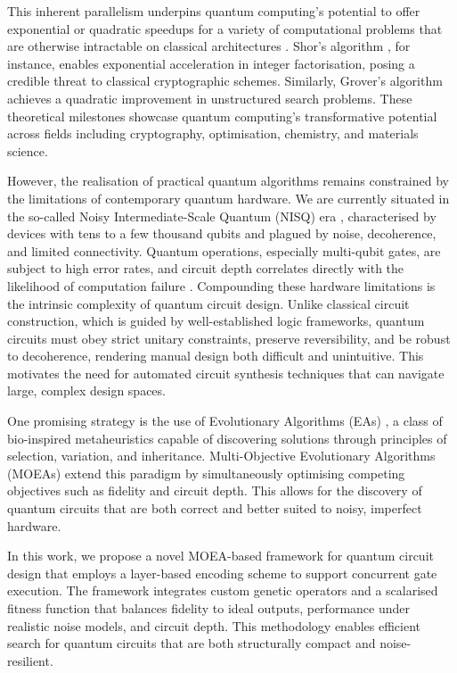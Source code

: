 \documentclass[11pt,a4paper]{article}
\begin{document}
This inherent parallelism underpins quantum computing’s potential to offer exponential or quadratic speedups for a variety of computational problems that are otherwise intractable on classical architectures \cite{nielsen2001quantum}. Shor’s algorithm \cite{Shor365700}, for instance, enables exponential acceleration in integer factorisation, posing a credible threat to classical cryptographic schemes. Similarly, Grover’s algorithm \cite{Khanal2021QuantumML} achieves a quadratic improvement in unstructured search problems. These theoretical milestones showcase quantum computing’s transformative potential across fields including cryptography, optimisation, chemistry, and materials science.\newline

However, the realisation of practical quantum algorithms remains constrained by the limitations of contemporary quantum hardware. We are currently situated in the so-called Noisy Intermediate-Scale Quantum (NISQ) era \cite{Preskill2018QuantumCI}, characterised by devices with tens to a few thousand qubits and plagued by noise, decoherence, and limited connectivity. Quantum operations, especially multi-qubit gates, are subject to high error rates, and circuit depth correlates directly with the likelihood of computation failure \cite{Clerk2008IntroductionTQ}. Compounding these hardware limitations is the intrinsic complexity of quantum circuit design. Unlike classical circuit construction, which is guided by well-established logic frameworks, quantum circuits must obey strict unitary constraints, preserve reversibility, and be robust to decoherence, rendering manual design both difficult and unintuitive. This motivates the need for automated circuit synthesis techniques that can navigate large, complex design spaces.\newline

One promising strategy is the use of Evolutionary Algorithms (EAs) \cite{Lukac2002EvolvingQC}, a class of bio-inspired metaheuristics capable of discovering solutions through principles of selection, variation, and inheritance. Multi-Objective Evolutionary Algorithms (MOEAs) \cite{moein} extend this paradigm by simultaneously optimising competing objectives such as fidelity and circuit depth. This allows for the discovery of quantum circuits that are both correct and better suited to noisy, imperfect hardware.\newline

In this work, we propose a novel MOEA-based framework for quantum circuit design that employs a layer-based encoding scheme to support concurrent gate execution. The framework integrates custom genetic operators and a scalarised fitness function that balances fidelity to ideal outputs, performance under realistic noise models, and circuit depth. This methodology enables efficient search for quantum circuits that are both structurally compact and noise-resilient.\newline
\end{document}
